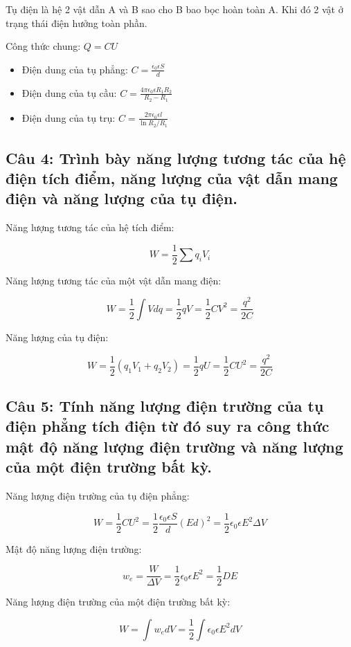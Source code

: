 Tụ điện là hệ 2 vật dẫn A và B sao cho B bao bọc hoàn toàn A. Khi đó 2 vật ở trạng thái điện hưởng toàn phần.

Công thức chung: $Q = CU$

\begin{itemize}
  \item Điện dung của tụ phẳng: $C = \frac{\epsilon_0\epsilon S}{d}$
  \item Điện dung của tụ cầu: $C = \frac{4\pi\epsilon_0\epsilon R_1R_2}{R_2-R_1}$
  \item Điện dung của tụ trụ: $C = \frac{2\pi\epsilon_0\epsilon l}{\ln{R_2 / R_1}}$
\end{itemize}
 
\subsection[Câu 4]{Câu 4: Trình bày năng lượng tương tác của hệ điện tích điểm, năng lượng của vật dẫn mang điện và năng lượng của tụ điện.}

Năng lượng tương tác của hệ tích điểm:

\begin{equation*}
  W = \frac{1}{2} \sum q_iV_i
\end{equation*}

Năng lượng tương tác của một vật dẫn mang điện:

\begin{equation*}
  W = \frac{1}{2} \int Vdq = \frac{1}{2} qV = \frac{1}{2} CV^2 = \frac{q^2}{2C}
\end{equation*}

Năng lượng của tụ điện:

\begin{equation*}
  W = \frac{1}{2} \left( q_1V_1 + q_2V_2 \right) = \frac{1}{2} qU = \frac{1}{2} CU^2 = \frac{q^2}{2C}
\end{equation*}

\subsection[Câu 5]{Câu 5: Tính năng lượng điện trường của tụ điện phẳng tích điện từ đó suy ra công thức mật độ năng lượng điện trường và năng lượng của một điện trường bất kỳ.}

Năng lượng điện trường của tụ điện phẳng:

\begin{equation*}
  W = \frac{1}{2} CU^2 = \frac{1}{2} \frac{\epsilon_0\epsilon S}{d} (Ed)^2 = \frac{1}{2}\epsilon_0\epsilon E^2 \Delta V
\end{equation*}

Mật độ năng lượng điện trường:

\begin{equation*}
  w_e = \frac{W}{\Delta V} = \frac{1}{2} \epsilon_0\epsilon E^2 = \frac{1}{2}DE
\end{equation*}

Năng lượng điện trường của một điện trường bất kỳ:

\begin{equation*}
  W = \int w_e dV = \frac{1}{2} \int \epsilon_0\epsilon E^2dV
\end{equation*}


